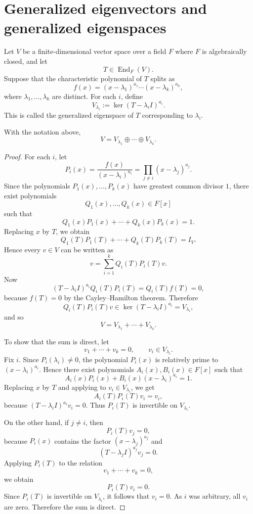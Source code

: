 \section{Generalized eigenvectors and generalized eigenspaces}

\begin{definition}
    Let $V$ be a finite-dimensional vector space over a field $F$ where $F$ is algebraically closed, and let
    \[
        T\in \operatorname{End}_F(V).
    \]
    Suppose that the characteristic polynomial of $T$ splits as
    \[
        f(x)=(x-\lambda_1)^{a_1}\cdots (x-\lambda_k)^{a_k},
    \]
    where $\lambda_1,\dots,\lambda_k$ are distinct. For each $i$, define
    \[
        V_{\lambda_i}:=\ker (T-\lambda_i I)^{a_i}.
    \]
    This is called the generalized eigenspace of $T$ corresponding to $\lambda_i$.
\end{definition}

\begin{theorem}
    With the notation above,
    \[
        V=V_{\lambda_1}\oplus \cdots \oplus V_{\lambda_k}.
    \]
\end{theorem}

\begin{proof}
    For each $i$, let
    \[
        P_i(x)=\frac{f(x)}{(x-\lambda_i)^{a_i}}
        =\prod_{j\ne i}(x-\lambda_j)^{a_j}.
    \]
    Since the polynomials $P_1(x),\dots,P_k(x)$ have greatest common divisor $1$, there exist polynomials
    \[
        Q_1(x),\dots,Q_k(x)\in F[x]
    \]
    such that
    \[
        Q_1(x)P_1(x)+\cdots+Q_k(x)P_k(x)=1.
    \]
    Replacing $x$ by $T$, we obtain
    \[
        Q_1(T)P_1(T)+\cdots+Q_k(T)P_k(T)=I_V.
    \]
    Hence every $v\in V$ can be written as
    \[
        v=\sum_{i=1}^k Q_i(T)P_i(T)v.
    \]
    Now
    \[
        (T-\lambda_i I)^{a_i}Q_i(T)P_i(T)
        =Q_i(T)f(T)=0,
    \]
    because $f(T)=0$ by the Cayley--Hamilton theorem. Therefore
    \[
        Q_i(T)P_i(T)v\in \ker (T-\lambda_i I)^{a_i}=V_{\lambda_i},
    \]
    and so
    \[
        V=V_{\lambda_1}+\cdots+V_{\lambda_k}.
    \]

    To show that the sum is direct, let
    \[
        v_1+\cdots+v_k=0,
        \qquad v_i\in V_{\lambda_i}.
    \]
    Fix $i$. Since $P_i(\lambda_i)\ne 0$, the polynomial $P_i(x)$ is relatively prime to $(x-\lambda_i)^{a_i}$. Hence there exist polynomials $A_i(x),B_i(x)\in F[x]$ such that
    \[
        A_i(x)P_i(x)+B_i(x)(x-\lambda_i)^{a_i}=1.
    \]
    Replacing $x$ by $T$ and applying to $v_i\in V_{\lambda_i}$, we get
    \[
        A_i(T)P_i(T)v_i=v_i,
    \]
    because $(T-\lambda_i I)^{a_i}v_i=0$. Thus $P_i(T)$ is invertible on $V_{\lambda_i}$.

    On the other hand, if $j\ne i$, then
    \[
        P_i(T)v_j=0,
    \]
    because $P_i(x)$ contains the factor $(x-\lambda_j)^{a_j}$ and
    \[
        (T-\lambda_j I)^{a_j}v_j=0.
    \]
    Applying $P_i(T)$ to the relation
    \[
        v_1+\cdots+v_k=0,
    \]
    we obtain
    \[
        P_i(T)v_i=0.
    \]
    Since $P_i(T)$ is invertible on $V_{\lambda_i}$, it follows that $v_i=0$. As $i$ was arbitrary, all $v_i$ are zero. Therefore the sum is direct.
\end{proof}

